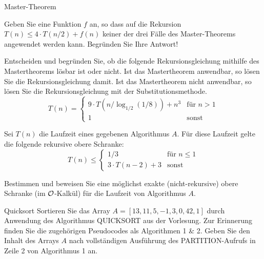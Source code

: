 \documentclass{exercisesheet}
\begin{document}
\begin{exercises}{Master-Theorem}
\item Geben Sie eine Funktion $f$ an, so dass auf die Rekursion $T(n) \leq 4 \cdot T(n/2) + f(n)$ keiner der drei Fälle des Master-Theorems angewendet werden kann. Begründen Sie Ihre Antwort!
\item Entscheiden und begründen Sie, ob die folgende Rekursionsgleichung mithilfe des Mastertheorems lösbar ist oder nicht. Ist das Mastertheorem anwendbar, so lösen Sie die Rekursionsgleichung damit. Ist das Mastertheorem nicht anwendbar, so lösen Sie die Rekursionsgleichung mit der Substitutionsmethode.
\begin{equation*}
  T(n) = \begin{cases}
    9 \cdot T(n/\log_{1/2}(1/8)) + n^3 & \text{für } n > 1 \\
    1                                  & \text{sonst}
  \end{cases}
\end{equation*}
\item Sei $T(n)$ die Laufzeit eines gegebenen Algorithmus $A$. Für diese Laufzeit gelte die folgende rekursive obere Schranke:
\begin{equation*}
  T(n) \leq \begin{cases}
    1/3                & \text{für } n \leq 1 \\
    3 \cdot T(n-2) + 3 & \text{sonst}
  \end{cases}
\end{equation*}
\item Bestimmen und beweisen Sie eine möglichst exakte (nicht-rekursive) obere Schranke (im $\mathcal{O}$-Kalkül) für die Laufzeit von Algorithmus $A$.
\end{exercises}

\begin{exercise}{Quicksort}
  Sortieren Sie das Array $A = [13,11,5, -1,3,0,42,1]$ durch Anwendung des Algorithmus QUICKSORT aus der Vorlesung. Zur Erinnerung finden Sie die zugehörigen Pseudocodes als Algorithmen 1 \& 2. Geben Sie den Inhalt des Arrays $A$ nach vollständigen Ausführung des PARTITION-Aufrufs in Zeile 2 von Algorithmus 1 an.
  \begin{algorithm}[ht]
    \caption{QUICKSORT($A, l, r$)}
  \end{algorithm}
\end{exercise}
\end{document}
